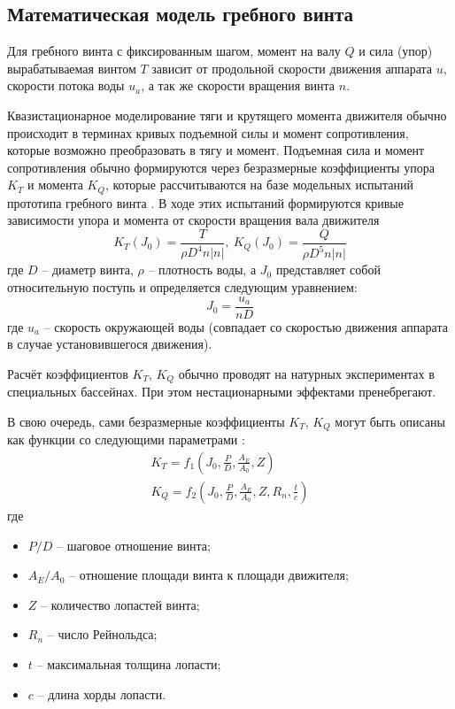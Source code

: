 \subsection{Математическая модель гребного винта}

Для гребного винта с фиксированным шагом, момент на валу $Q$ и сила (упор) вырабатываемая винтом $T$ зависит от продольной скорости движения аппарата $u$, скорости потока воды $u_a$, а так же скорости вращения винта $n$.

Квазистационарное моделирование тяги и крутящего момента движителя обычно происходит в терминах кривых подъемной силы и момент сопротивления, которые возможно преобразовать в тягу и момент.
Подъемная сила и момент сопротивления обычно формируются через безразмерные коэффициенты упора $K_T$ и момента $K_Q$, которые рассчитываются на базе модельных испытаний прототипа гребного винта \cite{daidola1992propeller}.
В ходе этих испытаний формируются кривые зависимости упора и момента от скорости вращения вала движителя
\begin{equation}
    \label{eq:propeler_model}
    K_T (J_0) = \frac{T}{\rho D^4 n |n|}, \:
    K_Q (J_0) = \frac{Q}{\rho D^5 n |n|}    
\end{equation}
\noindent где $D$ -- диаметр винта, $\rho$ -- плотность воды, а $J_0$ представляет собой относительную поступь и определяется следующим уравнением:
\begin{equation}
    \label{eq:ratio_1}
    J_0 = \frac{u_a}{nD}
\end{equation}
\noindent где $u_a$ -- скорость окружающей воды (совпадает со скоростью движения аппарата в случае установившегося движения).

Расчёт коэффициентов $K_T$, $K_Q$ обычно проводят на натурных экспериментах в специальных бассейнах.
При этом нестационарными эффектами пренебрегают.

В свою очередь, сами безразмерные коэффициенты $K_T$, $K_Q$ могут быть описаны как функции со следующими параметрами \cite{oosterveld1975further}:
\begin{gather*}
    K_T = f_1 \left( J_0, \frac{P}{D}, \frac{A_E}{A_0}, Z \right) \\
    K_Q = f_2 \left( J_0, \frac{P}{D}, \frac{A_E}{A_0}, Z, R_n, \frac{t}{c} \right) 
\end{gather*}
\noindent где
\begin{itemize}
    \item $P/D$ -- шаговое отношение винта;
    \item $A_E/A_0$ -- отношение площади винта к площади движителя;
    \item $Z$ -- количество лопастей винта;
    \item $R_n$ -- число Рейнольдса;
    \item $t$ -- максимальная толщина лопасти;
    \item $c$ -- длина хорды лопасти.
\end{itemize}

